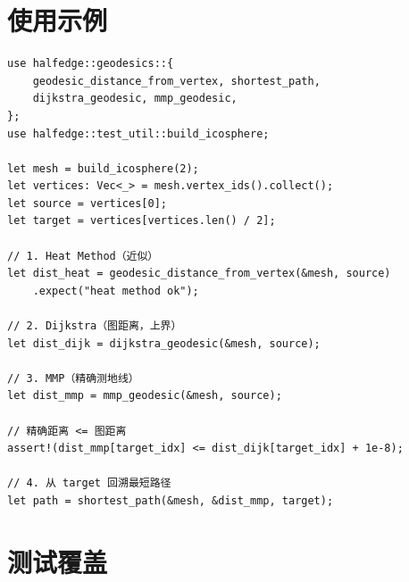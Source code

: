\documentclass[11pt,a4paper]{article}
\begin{document}
\section{使用示例}

\begin{lstlisting}
use halfedge::geodesics::{
    geodesic_distance_from_vertex, shortest_path,
    dijkstra_geodesic, mmp_geodesic,
};
use halfedge::test_util::build_icosphere;

let mesh = build_icosphere(2);
let vertices: Vec<_> = mesh.vertex_ids().collect();
let source = vertices[0];
let target = vertices[vertices.len() / 2];

// 1. Heat Method（近似）
let dist_heat = geodesic_distance_from_vertex(&mesh, source)
    .expect("heat method ok");

// 2. Dijkstra（图距离，上界）
let dist_dijk = dijkstra_geodesic(&mesh, source);

// 3. MMP（精确测地线）
let dist_mmp = mmp_geodesic(&mesh, source);

// 精确距离 <= 图距离
assert!(dist_mmp[target_idx] <= dist_dijk[target_idx] + 1e-8);

// 4. 从 target 回溯最短路径
let path = shortest_path(&mesh, &dist_mmp, target);
\end{lstlisting}

\section{测试覆盖}
\end{document}
